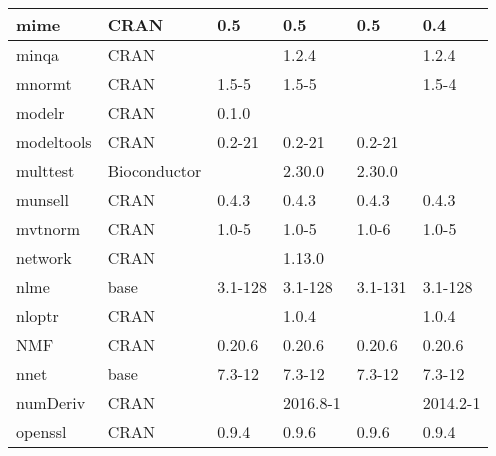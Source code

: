 \begin{longtable}{|llllll|}
mime                          & CRAN                      & 0.5         & 0.5         & 0.5            & 0.4              \\ \hline
minqa                         & CRAN                      &             & 1.2.4       &                & 1.2.4             \\ \hline \rowcolor{gray!25}
mnormt                        & CRAN                      & 1.5-5       & 1.5-5       &                & 1.5-4            \\ \hline
modelr                        & CRAN                      & 0.1.0       &             &                &                   \\ \hline \rowcolor{gray!25}
modeltools                    & CRAN                      & 0.2-21      & 0.2-21      & 0.2-21         &                  \\ \hline
multtest                      & Bioconductor              &             & 2.30.0      & 2.30.0         &                   \\ \hline \rowcolor{gray!25}
munsell                       & CRAN                      & 0.4.3       & 0.4.3       & 0.4.3          & 0.4.3            \\ \hline
mvtnorm                       & CRAN                      & 1.0-5       & 1.0-5       & 1.0-6          & 1.0-5             \\ \hline \rowcolor{gray!25}
network                       & CRAN                      &             & 1.13.0      &                &                  \\ \hline
nlme                          & base                      & 3.1-128     & 3.1-128     & 3.1-131        & 3.1-128           \\ \hline \rowcolor{gray!25}
nloptr                        & CRAN                      &             & 1.0.4       &                & 1.0.4            \\ \hline
NMF                           & CRAN                      & 0.20.6      & 0.20.6      & 0.20.6         & 0.20.6            \\ \hline \rowcolor{gray!25}
nnet                          & base                      & 7.3-12      & 7.3-12      & 7.3-12         & 7.3-12           \\ \hline
numDeriv                      & CRAN                      &             & 2016.8-1    &                & 2014.2-1          \\ \hline \rowcolor{gray!25}
openssl                       & CRAN                      & 0.9.4       & 0.9.6       & 0.9.6          & 0.9.4            \\ \hline

\end{longtable}
